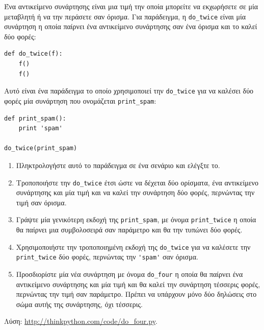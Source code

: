 \documentclass[10pt]{book}
\begin{document}
\begin{exercise}

Ένα αντικείμενο συνάρτησης είναι μια τιμή την οποία μπορείτε να εκχωρήσετε
σε μία μεταβλητή ή να την περάσετε σαν όρισμα. Για παράδειγμα, η \verb"do_twice" είναι μία συνάρτηση η οποία παίρνει ένα αντικείμενο συνάρτησης σαν ένα όρισμα και το καλεί δύο φορές:


\begin{verbatim}
def do_twice(f):
    f()
    f()
\end{verbatim}

Αυτό είναι ένα παράδειγμα το οποίο χρησιμοποιεί την \verb"do_twice" για να καλέσει δύο φορές μία συνάρτηση που ονομάζεται \verb"print_spam":


\begin{verbatim}
def print_spam():
    print 'spam'

do_twice(print_spam)
\end{verbatim}

\begin{enumerate}


\item Πληκτρολογήστε αυτό το παράδειγμα σε ένα σενάριο και ελέγξτε το.


\item Τροποποιήστε την \verb"do_twice" έτσι ώστε να δέχεται δύο ορίσματα, ένα
αντικείμενο συνάρτησης και μία τιμή και να καλεί την συνάρτηση δύο φορές, περνώντας την τιμή σαν όρισμα.


\item Γράψτε μία γενικότερη εκδοχή της \verb"print_spam", με όνομα
\verb"print_twice" η οποία θα παίρνει μια συμβολοσειρά σαν παράμετρο και θα την
τυπώνει δύο φορές.


\item Χρησιμοποιήστε την τροποποιημένη εκδοχή της \verb"do_twice" για να καλέσετε την \verb"print_twice" δύο φορές, περνώντας την \verb"'spam'" σαν όρισμα.


\item Προσδιορίστε μία νέα συνάρτηση με όνομα \verb"do_four" η οποία θα 
παίρνει ένα αντικείμενο συνάρτησης και μία τιμή και θα καλεί την συνάρτηση τέσσερις φορές, περνώντας την τιμή σαν παράμετρο. Πρέπει να υπάρχουν μόνο δύο δηλώσεις στο σώμα αυτής της συνάρτησης, όχι τέσσερις.


\end{enumerate}

Λύση: \url{http://thinkpython.com/code/do_four.py}.
\\
\end{exercise}
\end{document}
